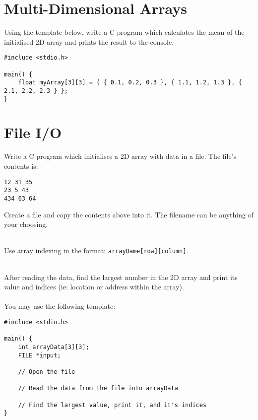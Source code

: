 \documentclass{lab}
\begin{document}
\pagebreak

\section{Multi-Dimensional Arrays}

\begin{task}{}{}
Using the template below, write a C program which calculates the mean of the initialised 2D array and prints the result to the console.

\begin{lstlisting}[style=Ctable]
#include <stdio.h>

main() {
	float myArray[3][3] = { { 0.1, 0.2, 0.3 }, { 1.1, 1.2, 1.3 }, { 2.1, 2.2, 2.3 } };
}
\end{lstlisting}
\end{task}


\section{File I/O}

\begin{task}{}{}
Write a C program which initialises a 2D array with data in a file. The file's contents is:

\begin{lstlisting}[style=Ctable]
12 31 35
23 5 43
434 63 64
\end{lstlisting}

Create a file and copy the contents above into it. The filename can be anything of your choosing.\\~

Use array indexing in the format: \texttt{arrayDame[row][column]}.\\~

After reading the data, find the largest number in the 2D array and print its value and indices (ie: location or address within the array).
\\~\\
You may use the following template:

\begin{lstlisting}[style=Ctable]
#include <stdio.h>

main() {
	int arrayData[3][3];
	FILE *input;
	
	// Open the file
	
	// Read the data from the file into arrayData
	
	// Find the largest value, print it, and it's indices
}
\end{lstlisting}
\end{task}
\end{document}
